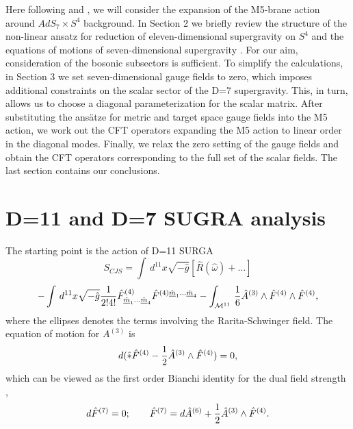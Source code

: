 \documentclass[a4paper,11pt]{article}
\begin{document}
Here following \cite{das} and \cite{tran}, we will consider the
expansion of the M5-brane action around $AdS_7\times S^4$
background.  In Section 2 we briefly review the structure of the
non-linear ansatz for reduction of eleven-dimensional supergravity
on $S^4$ and the equations of motions of seven-dimensional
supergravity \cite{nieuw,pope}. For our aim, consideration of the
bosonic subsectors is sufficient. To simplify the calculations, in
Section 3 we set seven-dimensional gauge fields to zero, which
imposes additional constraints on the scalar sector of the D=7
supergravity. This, in turn, allows us to choose a diagonal
parameterization for the scalar matrix. After substituting the
ans\"atze for metric and target space gauge fields into the M5
action, we work out the CFT operators expanding the M5 action to
linear order in the diagonal modes. Finally, we relax the zero
setting of the gauge fields and obtain the CFT operators
corresponding to the full set of the scalar fields. The last
section contains our conclusions.





\section{D=11 and D=7 SUGRA analysis}

The starting point is the action of D=11 SURGA \cite{CJS}
$$
S_{CJS}=\int \, d^{11}x \sqrt{-{\hat g}} [{\hat R}({\hat
\omega})+\dots ]
$$
\begin{equation}\plabel{cjs}
-\int
\, d^{11}x \sqrt{-{\hat g}}{1\over 2!4!}{\hat
F}^{(4)}_{\underline{\hat m}_1\dots
\underline{\hat m}_4}{\hat F}^{(4)\underline{\hat m}_1\dots
\underline{\hat m}_4}
-\int_{{\cal M}^{11}} \, {1\over 6}
{\hat A}^{(3)}\wedge {\hat F}^{(4)}\wedge {\hat F}^{(4)},
\end{equation}
where the ellipses denotes the terms involving the Rarita-Schwinger field.
The equation of motion for $A^{(3)}$ is
\begin{equation}\plabel{emA3}
d(\hat{\ast}{\hat F}^{(4)}-{1\over 2}{\hat A}^{(3)}\wedge {\hat
F}^{(4)})=0,
\end{equation}
which can be viewed as the first order Bianchi identity for the dual field strength \cite{bbs},
\cite{cjlp}
\begin{equation}\plabel{BI}
d{\hat F}^{(7)}=0;\qquad {\hat F}^{(7)}=d{\hat A}^{(6)}+{1\over 2}{\hat A}^{(3)}\wedge
{\hat F}^{(4)}.
\end{equation}
\end{document}
